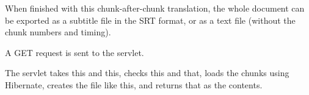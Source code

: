 
When finished with this chunk-after-chunk translation, the whole document can be exported as a subtitle file in the SRT format, or as a text file (without the chunk numbers and timing).

A GET request is sent to the servlet.

The servlet takes this and this, checks this and that, loads the chunks using Hibernate, creates the file like this, and returns that as the contents.

